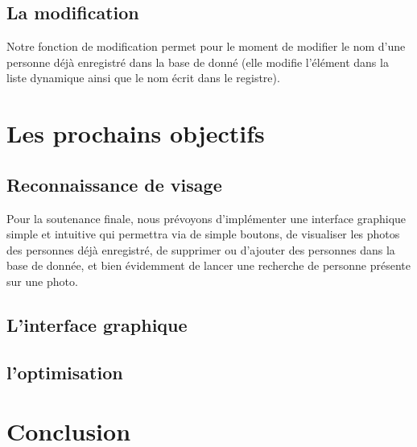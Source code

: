 \documentclass[12pt,a4paper]{article}
\begin{document}
\subsection{La modification}

Notre fonction de modification permet pour le moment de modifier le nom d'une personne déjà enregistré dans la base de donné (elle modifie l'élément dans la liste dynamique ainsi que le nom écrit dans le registre).


\newpage
\section{Les prochains objectifs}
\subsection{Reconnaissance de visage}

Pour la soutenance finale, nous prévoyons d'implémenter une interface graphique simple et intuitive qui permettra via de simple boutons, de visualiser les photos des personnes déjà enregistré, de supprimer ou d'ajouter des personnes dans la base de donnée, et bien évidemment de lancer une recherche de personne présente sur une photo.


\newpage
\subsection{L'interface graphique}


\newpage
\subsection{l'optimisation}


\newpage

\section*{Conclusion}
\end{document}
